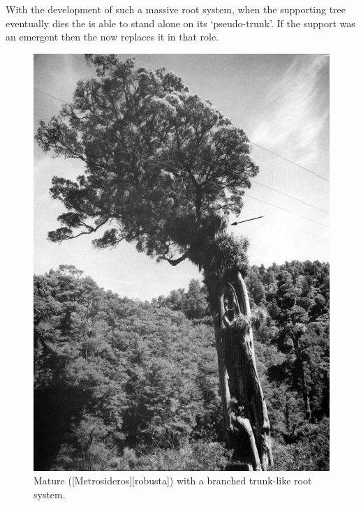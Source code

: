 With the development of such a massive root system, when the supporting tree eventually dies the  is able to stand alone on its `pseudo-trunk'.
If the support was an emergent then the  now replaces it in that role.

\begin{figure}[t]
	\begin{minipage}[t]{\textwidth}
		\begin{minipage}[t]{(\textwidth-\fgap) * \real{0.536}}
			\centering
			\includegraphics[width=\textwidth]{graphics/fig_052}
			\caption[Mature northern rata with a branched trunk-like root system]{Mature  ([Metrosideros][robusta]) with a branched trunk-like root system.
}
\end{minipage}
\end{minipage}
\end{figure}
